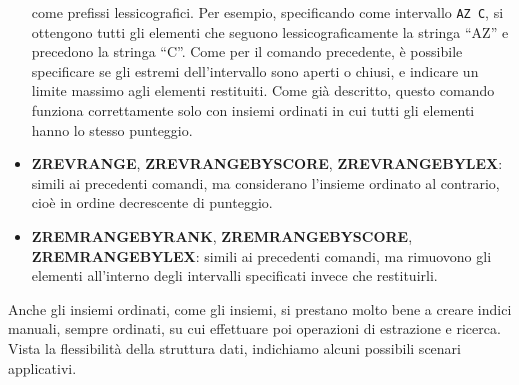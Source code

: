 \begin{itemize}
	come prefissi lessicografici. Per esempio, specificando come intervallo \verb|AZ C|, si
	ottengono tutti gli elementi che seguono lessicograficamente la stringa ``AZ'' e precedono la
	stringa ``C''. Come per il comando precedente, è possibile specificare se gli estremi
	dell'intervallo sono aperti o chiusi, e indicare un limite massimo agli elementi restituiti.
	Come già descritto, questo comando funziona correttamente solo con insiemi ordinati in cui
	tutti gli elementi hanno lo stesso punteggio.
	\item \textbf{ZREVRANGE}, \textbf{ZREVRANGEBYSCORE}, \textbf{ZREVRANGEBYLEX}: simili ai
	precedenti comandi, ma considerano l'insieme ordinato al contrario, cioè in ordine decrescente
	di punteggio.
	\item \textbf{ZREMRANGEBYRANK}, \textbf{ZREMRANGEBYSCORE}, \textbf{ZREMRANGEBYLEX}: simili ai
	precedenti comandi, ma rimuovono gli elementi all'interno degli intervalli specificati invece
	che restituirli.
\end{itemize}

Anche gli insiemi ordinati, come gli insiemi, si prestano molto bene a creare indici manuali,
sempre ordinati, su cui effettuare poi operazioni di estrazione e ricerca. Vista la flessibilità
della struttura dati, indichiamo alcuni possibili scenari applicativi.

